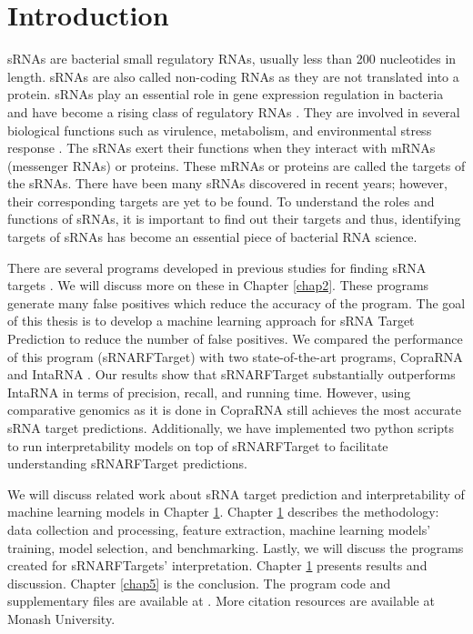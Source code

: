 \section{Introduction}
\label{chap1}

sRNAs are bacterial small regulatory RNAs, usually less than 200 nucleotides in length\cite{wiki:sRNA:2021}. sRNAs are also called non-coding RNAs as they are not translated into a protein. sRNAs play an essential role in gene expression regulation in bacteria and have become a rising class of regulatory RNAs \cite{WAGNER2015133}. They are involved in several biological functions such as virulence, metabolism, and environmental stress response \cite{WAGNER2015133}. The sRNAs exert their functions when they interact with mRNAs (messenger RNAs) or proteins. These mRNAs or proteins are called the targets of the sRNAs. There have been many sRNAs discovered in recent years; however, their corresponding targets are yet to be found. To understand the roles and functions of sRNAs, it is important to find out their targets and thus, identifying targets of sRNAs has become an essential piece of bacterial RNA science.

There are several programs developed in previous studies for finding sRNA targets \cite{Adrien2015}. We will discuss more on these in Chapter \ref{chap2}. These programs generate many false positives which reduce the accuracy of the program. The goal of this thesis is to develop a machine learning approach for sRNA Target Prediction to reduce the number of false positives. We compared the performance of this program (sRNARFTarget) with two state-of-the-art programs, CopraRNA \cite{Wright2013} and IntaRNA \cite{Richter2008}.  Our results show that sRNARFTarget substantially outperforms IntaRNA in terms of precision, recall, and running time. However, using comparative genomics as it is done in CopraRNA still achieves the most accurate sRNA target predictions. Additionally, we have implemented two python scripts to run interpretability models on top of sRNARFTarget to facilitate understanding sRNARFTarget predictions.

We will discuss related work about sRNA target prediction and interpretability of machine learning models in Chapter \ref{chap1}. Chapter \ref{chap1} describes the methodology: data collection and processing, feature extraction, machine learning models' training, model selection, and benchmarking. Lastly, we will discuss the programs created for sRNARFTargets' interpretation. Chapter \ref{chap1} presents results and discussion. Chapter \ref{chap5} is the conclusion. The program code and supplementary files are available at \cite{Haynes2013, wilcox}. More citation resources are available at Monash University\cite{monashCitations2021}.

